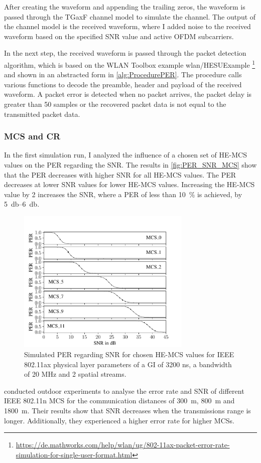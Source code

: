 After creating the waveform and appending the trailing zeros, the waveform is passed through the TGaxF channel model to simulate the channel.
The output of the channel model is the received waveform, where I added noise to the received waveform based on the
specified \ac{SNR} value and active \ac{OFDM} subcarriers.

In the next step, the received waveform is passed through the packet detection algorithm, which is based on the
WLAN Toolbox example wlan/HESUExample \footnote{\url{https://de.mathworks.com/help/wlan/ug/802-11ax-packet-error-rate-simulation-for-single-user-format.html}} and
shown in an abstracted form in \autoref{alg:ProcedurePER}.
The procedure calls various functions to decode the preamble, header and payload of
the received waveform.
A packet error is detected when no packet arrives, the packet delay is greater than \num{50} samples or the recovered packet data
is not equal to the transmitted packet data.

\subsubsection*{\acf{MCS} and \acf{CR}}
In the first simulation run, I analyzed the influence of a chosen set of HE-MCS values on the \ac{PER} regarding the \ac{SNR}.
The results in \autoref{fig:PER_SNR_MCS} show that the \ac{PER} decreases with higher \ac{SNR} for all HE-MCS values. The
\ac{PER} decreases at lower \ac{SNR} values for lower HE-MCS values. Increasing the HE-MCS value by \num{2} increases the \ac{SNR}, where a \ac{PER} of less than
\SI{10}{\percent} is achieved, by \SIrange{5}{6}{\decibel}.
\begin{figure}[H]%
   \centering
   \includegraphics[width=0.74\textwidth]{figures/MCS_PER_to_SNR.pdf}
   \caption{Simulated PER regarding SNR for chosen HE-MCS values for IEEE 802.11ax physical layer parameters
         of a GI of 3200 ns, a bandwidth of 20 MHz and \num{2} spatial streams.}
   \label{fig:PER_SNR_MCS}%
\end{figure}
\textcite{paul_characterizing_2011} conducted outdoor experiments to analyse the error rate and \ac{SNR} of different IEEE 802.11n \ac{MCS} for the
communication distances of \SI{300}{\meter}, \SI{800}{\meter} and \SI{1800}{\meter}. Their results show that \ac{SNR} decreases when the transmissions range is longer.
Additionally, they experienced a higher error rate for higher \acp{MCS}.

